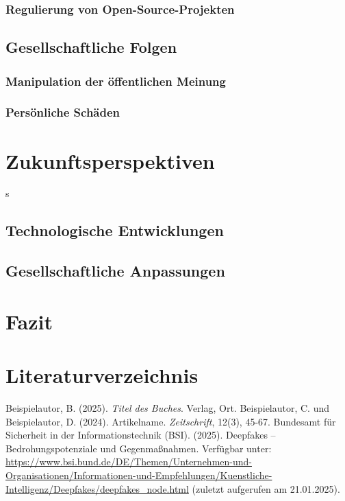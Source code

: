 \documentclass[a4paper,12pt]{article}
\begin{document}
\subsubsection{Regulierung von Open-Source-Projekten}
\subsection{Gesellschaftliche Folgen}
\subsubsection{Manipulation der öffentlichen Meinung}
\subsubsection{Persönliche Schäden}
\newpage
\section{Zukunftsperspektiven}s
\subsection{Technologische Entwicklungen}
\subsection{Gesellschaftliche Anpassungen}
\newpage
\section{Fazit}



\newpage
{}
\section*{Literaturverzeichnis}
\begin{thebibliography}{99}
     Beispielautor, B. (2025). \textit{Titel des Buches}. Verlag, Ort.
     Beispielautor, C. und Beispielautor, D. (2024). Artikelname. \textit{Zeitschrift}, 12(3), 45-67.
     Bundesamt für Sicherheit in der Informationstechnik (BSI). (2025). Deepfakes – Bedrohungspotenziale und Gegenmaßnahmen. Verfügbar unter: \url{https://www.bsi.bund.de/DE/Themen/Unternehmen-und-Organisationen/Informationen-und-Empfehlungen/Kuenstliche-Intelligenz/Deepfakes/deepfakes_node.html} (zuletzt aufgerufen am 21.01.2025).
\end{thebibliography}
\end{document}

